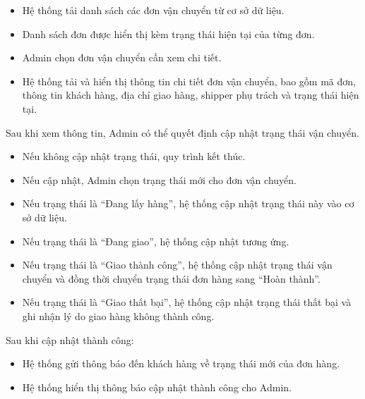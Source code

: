 \begin{itemize}
    \item Hệ thống tải danh sách các đơn vận chuyển từ cơ sở dữ liệu.
    
    \item Danh sách đơn được hiển thị kèm trạng thái hiện tại của từng đơn.
    
    \item Admin chọn đơn vận chuyển cần xem chi tiết.
    
    \item Hệ thống tải và hiển thị thông tin chi tiết đơn vận chuyển, bao gồm mã đơn, thông tin khách hàng, địa chỉ giao hàng, shipper phụ trách và trạng thái hiện tại.
\end{itemize}

Sau khi xem thông tin, Admin có thể quyết định cập nhật trạng thái vận chuyển.

\begin{itemize}
    \item Nếu không cập nhật trạng thái, quy trình kết thúc.
    
    \item Nếu cập nhật, Admin chọn trạng thái mới cho đơn vận chuyển.
\end{itemize}

\begin{itemize}
    \item Nếu trạng thái là ``Đang lấy hàng'', hệ thống cập nhật trạng thái này vào cơ sở dữ liệu.
    
    \item Nếu trạng thái là ``Đang giao'', hệ thống cập nhật tương ứng.
    
    \item Nếu trạng thái là ``Giao thành công'', hệ thống cập nhật trạng thái vận chuyển và đồng thời chuyển trạng thái đơn hàng sang ``Hoàn thành''.
    
    \item Nếu trạng thái là ``Giao thất bại'', hệ thống cập nhật trạng thái thất bại và ghi nhận lý do giao hàng không thành công.
\end{itemize}

Sau khi cập nhật thành công:

\begin{itemize}
    \item Hệ thống gửi thông báo đến khách hàng về trạng thái mới của đơn hàng.
    
    \item Hệ thống hiển thị thông báo cập nhật thành công cho Admin.
\end{itemize}

